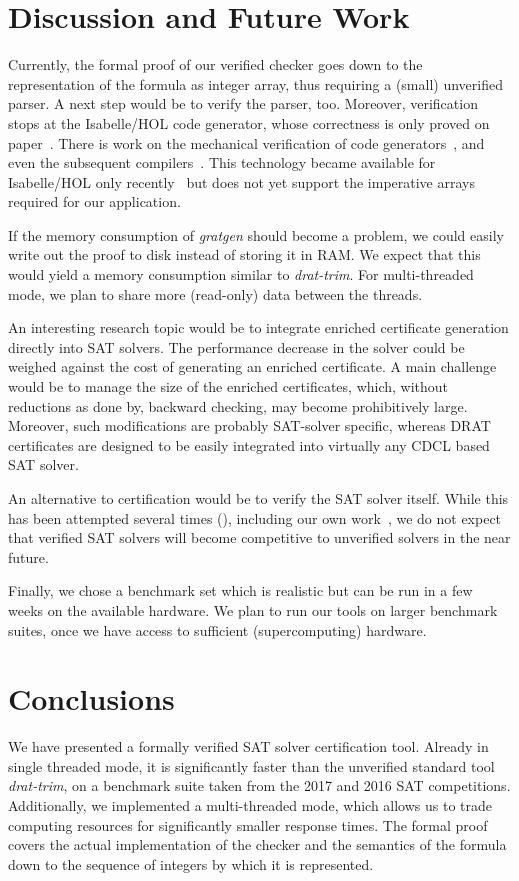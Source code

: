 \documentclass[smallcondensed]{svjour3}     %
\begin{document}
\section{Discussion and Future Work}\label{sec:disc}  
Currently, the formal proof of our verified checker goes down to the representation of the formula as integer array,
thus requiring a (small) unverified parser. A next step would be to verify the parser, too.
Moreover, verification stops at the Isabelle/HOL code generator, whose correctness is only proved on paper~\cite{HaNi10,HKKN13}. 
There is work on the mechanical verification of code generators~\cite{MO14}, and even the subsequent compilers~\cite{KMNO14}.
This technology became available for Isabelle/HOL only recently~\cite{HuNi18} but does not yet support the imperative arrays required for our application.

If the memory consumption of {\sl gratgen} should become a problem, we could easily write out the proof to disk instead of storing it in RAM. 
We expect that this would yield a memory consumption similar to {\sl drat-trim}. For multi-threaded mode, we plan to share more (read-only) data between the threads.

An interesting research topic would be to integrate enriched certificate generation directly into SAT solvers. 
The performance decrease in the solver could be weighed against the cost of generating an enriched certificate.
A main challenge would be to manage the size of the enriched certificates, which, without reductions as done by, 
\eg backward checking, may become prohibitively large.
Moreover, such modifications are probably SAT-solver specific, whereas DRAT certificates are designed to be
easily integrated into virtually any CDCL based SAT solver.

An alternative to certification would be to verify the SAT solver itself. While this has been attempted several times (\eg \cite{Maric10,OSOC12}), 
including our own work~\cite{FBL18}, we do not expect that verified SAT solvers will become competitive to unverified solvers in the near future.

Finally, we chose a benchmark set which is realistic but can be run in a few weeks on the available hardware.
We plan to run our tools on larger benchmark suites, once we have access to sufficient (supercomputing) hardware.
  
\section{Conclusions}\label{sec:concl}
We have presented a formally verified SAT solver certification tool. 
Already in single threaded mode, it is significantly faster than the unverified standard tool {\sl drat-trim}, on a benchmark 
suite taken from the 2017 and 2016 SAT competitions.
Additionally, we implemented a multi-threaded mode, 
which allows us to trade computing resources for significantly smaller response times.
The formal proof covers the actual implementation of the checker and the semantics of the 
formula down to the sequence of integers by which it is represented.
\end{document}
